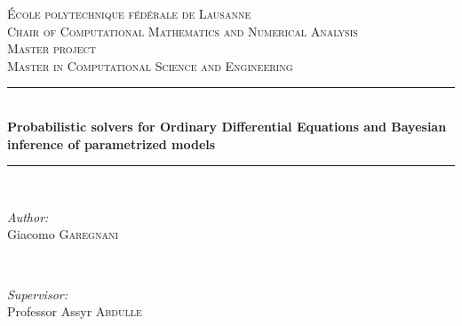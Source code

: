 \begin{titlepage}
\newcommand{\HRule}{\rule{\linewidth}{0.5mm}} %

\center %
 

\vspace{3cm}
\textsc{\LARGE École polytechnique fédérale de Lausanne}\\[0.5cm] %
\textsc{\large Chair of Computational Mathematics and Numerical Analysis}\\[1.5cm] %
\textsc{\LARGE Master project}\\[0.5cm] %
\textsc{\large Master in Computational Science and Engineering}\\[0.5cm] %


\HRule \\[0.4cm]
{ \huge \bfseries Probabilistic solvers for Ordinary Differential Equations and Bayesian inference of parametrized models}\\[0.4cm] %
\HRule \\[1.5cm]
 

\begin{minipage}{0.4\textwidth}
\begin{flushleft} \large
\emph{Author:}\\
Giacomo \textsc{Garegnani}
\end{flushleft}
\end{minipage}
~
\begin{minipage}{0.4\textwidth}
\begin{flushright} \large
\emph{Supervisor:} \\
Professor Assyr \textsc{Abdulle}%
\end{flushright}
\end{minipage}\\[8cm]


\end{titlepage}

